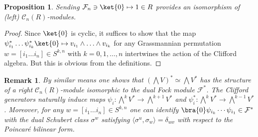 \documentclass[12pt]{amsart}
\newcommand{\mc}[1]{\mathcal{#1}}
\newcommand{\ring}{R}
\newtheorem{remark}{Remark}[section]
\newtheorem{prop}{Proposition}[section]
\numberwithin{equation}{section}
\numberwithin{figure}{section}
\begin{document}
\begin{prop}
    Sending $\mc{F}_n\ni\ket{0}\mapsto 1\in\ring$ provides an isomorphism of (left) $\mc{C}_n(\ring)$-modules.
\end{prop}
\begin{proof}
Since $\ket{0}$ is cyclic, it suffices to show that the map $\psi^*_{i_1}\ldots\psi^*_{i_k}\ket{0}\mapsto v_{i_1}\wedge\ldots\wedge v_{i_k}$ for any Grassmannian permutation $w=[i_1\ldots i_n]\in S^{k,n}$ with $k=0,1,\ldots,n$ intertwines the action of the Clifford algebra. But this is obvious from the definitions.
\end{proof}

\begin{remark}\rm
    By similar means one shows that $(\bigwedge V)^*\simeq\bigwedge V^*$ has the structure of a {\em right} $\mc{C}_n(\ring)$-module isomorphic to the dual Fock module $\mc{F}^*$. The Clifford generators naturally induce maps $\psi_i:\bigwedge^kV^*\to\bigwedge^{k+1}V^*$ and $\psi^*_i:\bigwedge^kV^*\to\bigwedge^{k-1}V^*$. Moreover, for any $w=[i_1\ldots i_n]\in S^{k,n}$ one can identify $\bra{0}\psi_{i_k}\cdots\psi_{i_1}\in\mc{F^*}$ with the dual Schubert class $\sigma^w$ satisfying $\langle\sigma^u,\sigma_w\rangle=\delta_{uw}$ with respect to the Poincar\'e bilinear form.
\end{remark}
\end{document}
